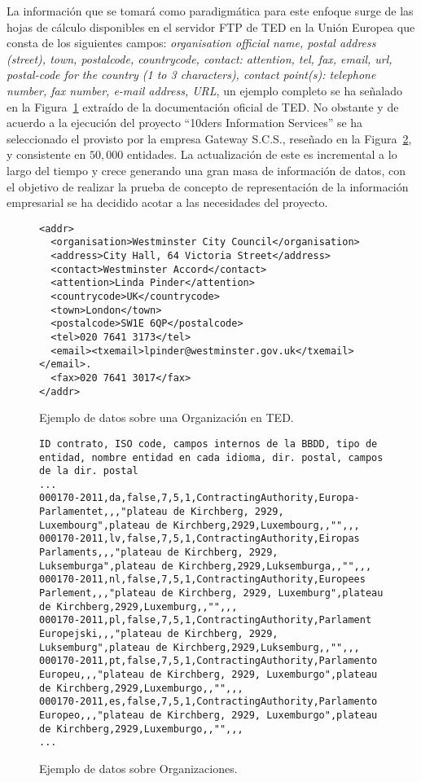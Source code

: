 La información que se tomará como paradigmática para este enfoque surge de las hojas de cálculo disponibles en el servidor 
\gls{FTP} de \gls{TED} en la Unión Europea que consta de los siguientes campos: \textit{organisation official name, postal address (street), town, 
postalcode, countrycode, contact: attention, tel, fax, email, url, postal-code for the country (1 to 3 characters), contact point(s): telephone number, 
fax number, e-mail address, \gls{URL}}, un ejemplo completo se ha señalado en la Figura~\ref{fig:orgs-example-ted} extraído 
de la documentación oficial de TED. No obstante y de acuerdo a la ejecución del proyecto ``10ders Information Services'' se ha seleccionado 
el \dataset provisto por la empresa Gateway S.C.S., reseñado en la Figura~\ref{fig:orgs-example}, y consistente en $50,000$ entidades. La actualización 
de este \dataset es incremental a lo largo del tiempo y crece generando una gran masa de información de datos, con el objetivo de realizar la prueba 
de concepto de representación de la información empresarial se ha decidido acotar a las necesidades del proyecto.

\begin{figure}[!htp]
\begin{lstlisting} 
<addr>
  <organisation>Westminster City Council</organisation>
  <address>City Hall, 64 Victoria Street</address>
  <contact>Westminster Accord</contact>
  <attention>Linda Pinder</attention>
  <countrycode>UK</countrycode>
  <town>London</town>
  <postalcode>SW1E 6QP</postalcode>
  <tel>020 7641 3173</tel>
  <email><txemail>lpinder@westminster.gov.uk</txemail></email>.
  <fax>020 7641 3017</fax>
</addr>
\end{lstlisting}
	\caption{Ejemplo de datos sobre una Organización en TED.}
	\label{fig:orgs-example-ted}
\end{figure}


\begin{figure}[!htp]
\begin{lstlisting} 
ID contrato, ISO code, campos internos de la BBDD, tipo de entidad, nombre entidad en cada idioma, dir. postal, campos de la dir. postal
...
000170-2011,da,false,7,5,1,ContractingAuthority,Europa-Parlamentet,,,"plateau de Kirchberg, 2929, Luxembourg",plateau de Kirchberg,2929,Luxembourg,,"",,,
000170-2011,lv,false,7,5,1,ContractingAuthority,Eiropas Parlaments,,,"plateau de Kirchberg, 2929, Luksemburga",plateau de Kirchberg,2929,Luksemburga,,"",,,
000170-2011,nl,false,7,5,1,ContractingAuthority,Europees Parlement,,,"plateau de Kirchberg, 2929, Luxemburg",plateau de Kirchberg,2929,Luxemburg,,"",,,
000170-2011,pl,false,7,5,1,ContractingAuthority,Parlament Europejski,,,"plateau de Kirchberg, 2929, Luksemburg",plateau de Kirchberg,2929,Luksemburg,,"",,,
000170-2011,pt,false,7,5,1,ContractingAuthority,Parlamento Europeu,,,"plateau de Kirchberg, 2929, Luxemburgo",plateau de Kirchberg,2929,Luxemburgo,,"",,,
000170-2011,es,false,7,5,1,ContractingAuthority,Parlamento Europeo,,,"plateau de Kirchberg, 2929, Luxemburgo",plateau de Kirchberg,2929,Luxemburgo,,"",,,
...
\end{lstlisting}
	\caption{Ejemplo de datos sobre Organizaciones.}
	\label{fig:orgs-example}
\end{figure}


